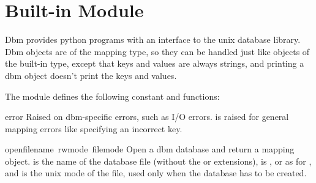 \section{Built-in Module }

Dbm provides python programs with an interface to the unix 
database library.  Dbm objects are of the mapping type, so they can be
handled just like objects of the built-in  type,
except that keys and values are always strings, and printing a dbm
object doesn't print the keys and values.

The module defines the following constant and functions:

\renewcommand{\indexsubitem}{(in module dbm)}
\begin{excdesc}{error}
Raised on dbm-specific errors, such as I/O errors.  is
raised for general mapping errors like specifying an incorrect key.
\end{excdesc}

\begin{funcdesc}{open}{filename\, rwmode\, filemode}
Open a dbm database and return a mapping object.   is
the name of the database file (without the  or 
extensions),  is ,  or  as for
, and  is the unix mode of the file, used only
when the database has to be created.
\end{funcdesc}
